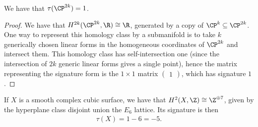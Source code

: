 \documentclass[11pt]{book}
\begin{document}
\begin{example}\label{exa:signature-CP2k} We have that $\tau(\CP^{2k}) = 1$.
\end{example}
\begin{proof} We have that $H^{2k}(\CP^{2k},\R) \cong \R$, generated by a copy of $\CP^k \subseteq \CP^{2k}$. One way to represent this homology class by a submanifold is to take $k$ generically chosen linear forms in the homogeneous coordinates of $\CP^{2k}$ and intersect them. This homology class has self-intersection one (since the intersection of $2k$ generic linear forms gives a single point), hence the matrix representing the signature form is the $1\times1$ matrix $\begin{pmatrix} 1 \end{pmatrix}$, which has signature $1$.
\end{proof}


\begin{example}\label{exa:index-cubic-surface-by-cohomology} 
If $X$ is a smooth complex cubic surface, we have that $H^2(X,\Z) \cong \Z^{\oplus7}$, given by the hyperplane class disjoint union the $E_6$ lattice. Its signature is then 
\begin{align*}
    \tau(X) = 1-6 = -5.
\end{align*}
\end{example}
\end{document}
